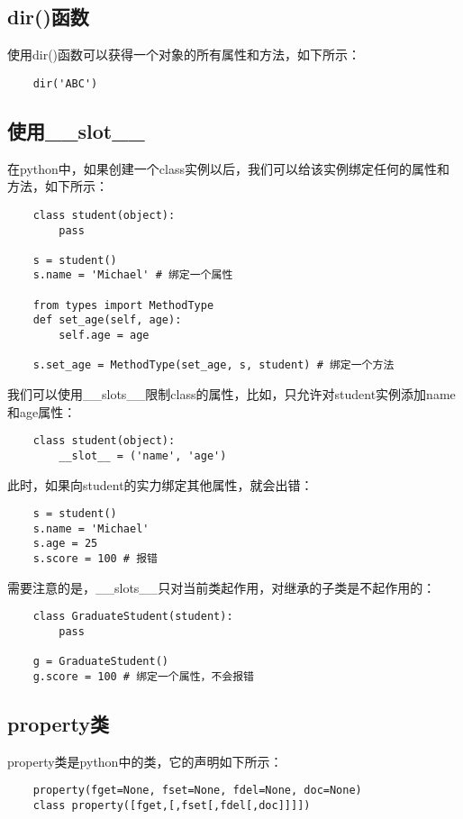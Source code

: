 \documentclass[a4paper,left=2.5cm,right=2.5cm,11pt]{article}
\begin{document}
\subsection{dir()函数}
	使用dir()函数可以获得一个对象的所有属性和方法，如下所示：
	\begin{lstlisting}
	dir('ABC')
	\end{lstlisting}

\subsection{使用\_\_slot\_\_}
	在python中，如果创建一个class实例以后，我们可以给该实例绑定任何的属性和方法，如下所示：
	\begin{lstlisting}
	class student(object):
		pass

	s = student()
	s.name = 'Michael' # 绑定一个属性

	from types import MethodType
	def set_age(self, age):
		self.age = age

	s.set_age = MethodType(set_age, s, student) # 绑定一个方法
	\end{lstlisting}

	我们可以使用\_\_slots\_\_限制class的属性，比如，只允许对student实例添加name和age属性：
	\begin{lstlisting}
	class student(object):
		__slot__ = ('name', 'age')
	\end{lstlisting}

	此时，如果向student的实力绑定其他属性，就会出错：
	\begin{lstlisting}
	s = student()
	s.name = 'Michael'
	s.age = 25
	s.score = 100 # 报错
	\end{lstlisting}

	需要注意的是，\_\_slots\_\_只对当前类起作用，对继承的子类是不起作用的：
	\begin{lstlisting}
	class GraduateStudent(student):
		pass

	g = GraduateStudent()
	g.score = 100 # 绑定一个属性，不会报错
	\end{lstlisting}

\subsection{property类}
	property类是python中的类，它的声明如下所示：
	\begin{lstlisting}
	property(fget=None, fset=None, fdel=None, doc=None)
	class property([fget,[,fset[,fdel[,doc]]]])
	\end{lstlisting}
\end{document}

